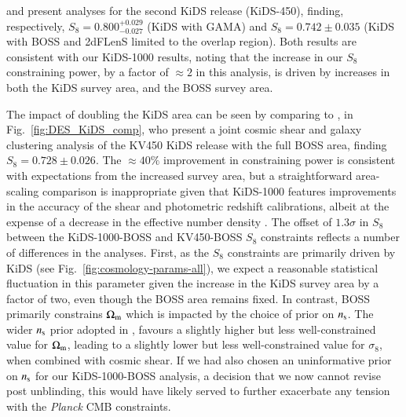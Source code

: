 \citet{vanuitert/etal:2018} and \citet{joudaki/etal:2018} present \tttp analyses for the second KiDS release (KiDS-450), finding, respectively, $S_8 = 0.800_{-0.027}^{+0.029}$ (KiDS with GAMA) and $S_8 = 0.742 \pm 0.035$ (KiDS with BOSS and 2dFLenS limited to the overlap region). 
Both results are consistent with our KiDS-1000 results, noting that the increase in our $S_8$ constraining power, by a factor of $\approx\! 2$ in this analysis, is driven by increases in both the KiDS survey area, and the BOSS survey area.  

The impact of doubling the KiDS area can be seen by comparing to \citet{troester/etal:2020}, in Fig.~\ref{fig:DES_KiDS_comp}, who present a joint cosmic shear and galaxy clustering analysis of the KV450 KiDS release with the full BOSS area, finding $S_8 = 0.728 \pm 0.026$.   The $\approx\!40\%$ improvement in constraining power is consistent with expectations from the increased survey area, but a straightforward area-scaling comparison is inappropriate given that KiDS-1000 features improvements in the accuracy of the shear and photometric redshift calibrations, albeit at the expense of a decrease in the effective number density \citep[see][for details]{giblin/etal:inprep}.  
The offset of $1.3\sigma$ in $S_8$ between the KiDS-1000-BOSS and KV450-BOSS $S_8$ constraints reflects a number of differences in the analyses.  First, as the \tttp $S_8$ constraints are primarily driven by KiDS (see Fig.~\ref{fig:cosmology-params-all}), we expect a reasonable statistical fluctuation in this parameter given the increase in the KiDS survey area by a factor of two, even though the BOSS area remains fixed.   In contrast, BOSS primarily constrains $\Omega_{\rm m}$ which is impacted by the choice of prior on $n_{\rm s}$.  The wider $n_{\rm s}$ prior adopted in \citet{troester/etal:2020}, favours a slightly higher but less well-constrained value for $\Omega_{\rm m}$, leading to a slightly lower but less well-constrained value for $\sigma_8$, when combined with cosmic shear.   If we had also chosen an uninformative prior on $n_{\rm s}$ for our KiDS-1000-BOSS analysis, a decision that we now cannot revise post unblinding, this would have likely served to further exacerbate any tension with the {\it Planck} CMB constraints.   



